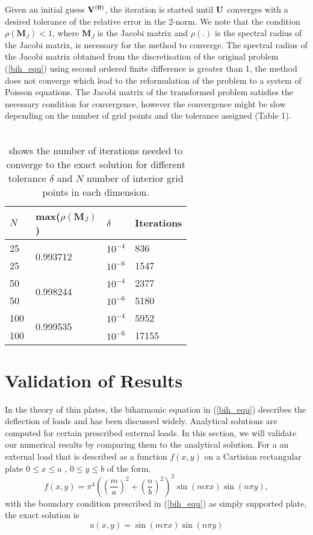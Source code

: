 Given an initial guess $\bf{V^{(0)}}$, the iteration is started until $\bf{U}$ converges with a desired tolerance of the relative error in the 2-norm. We note that the condition $\rho(\textbf{M}_J) < 1$, where $\textbf{M}_J$  is the Jacobi matrix and $\rho(.)$ is the spectral radius of the Jacobi matrix, is necessary for the method to converge. The spectral radius of the Jacobi matrix obtained from the discretisation of the original problem (\ref{bih_equ}) using second ordered finite difference is greater than 1, the method does not converge which lead to  the reformulation of the problem to a system of Poisson equations. The Jacobi matrix of the transformed problem satisfies the necessary condition for convergence, however the convergence might be slow depending on the number of grid points and the tolerance assigned (Table 1). \\
~\\
\begin{table*}[h]
\centering
\begin{tabular}{|p{0.15\linewidth}p{0.15\linewidth}p{0.15\linewidth}p{0.15\linewidth}|}
\hline
$N$ & max($\rho(\textbf{M}_J)$)& $\delta$ & Iterations\\
\hline
25   & \multirow{2}{*}{0.993712}&$10^{-4}$ & 836\\
25   & &$10^{-6}$ & 1547\\
\hline
50   & \multirow{2}{*}{0.998244}&$10^{-4}$ & 2377\\
50   & &$10^{-6}$ & 5180\\
\hline
100  &\multirow{2}{*}{0.999535} &$10^{-4}$ & 5952\\
100  & &$10^{-6}$ & 17155\\
\hline
\end{tabular}
\caption{shows the number of iterations needed to converge to the exact solution for different tolerance $\delta$ and $N$ number of interior grid points in each dimension.}
\end{table*}

\section{Validation of Results}
In the theory of thin plates, the biharmonic equation in (\ref{bih_equ}) describes the deflection of loads and has been discussed widely. Analytical solutions are computed for certain prescribed external loads. In this section, we will validate our numerical results by comparing them to the analytical solution. For a an external load that is described as a function $f(x,y)$ on a Cartisian rectangular plate $0\leq x\leq a$ ,
$0\leq y\leq b$ of the form,
\begin{equation}
f(x,y) = \pi^4\left(\left(\frac{m}{a}\right)^2 + \left(\frac{n}{b}\right)^2\right)^2\sin(m\pi x)\sin(n\pi y),
\end{equation}
with the boundary condition prescribed in (\ref{bih_equ}) as simply supported plate, the exact solution is
\begin{equation}
u(x,y) = \sin(m\pi x)\sin(n\pi y)
\end{equation}

